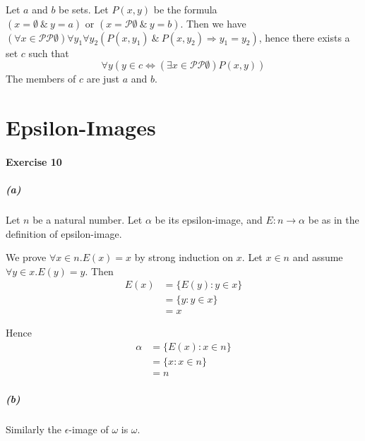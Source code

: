 \documentclass{report}
\begin{document}
     Let $a$ and $b$ be sets. Let $P(x,y)$ be the formula $(x = \emptyset \ \&\ y = a) \text{ or }
     (x = \mathcal{P} \emptyset \ \&\ y = b)$. Then we have $(\forall x \in \mathcal{P} \mathcal{P}
     \emptyset) \forall y_1 \forall y_2 (P(x,y_1) \ \&\ P(x,y_2) \Rightarrow y_1 = y_2)$,
     hence there exists a set $c$ such that
     \[ \forall y (y \in c \Leftrightarrow (\exists x \in \mathcal{P} \mathcal{P} \emptyset) P(x,y)) \]
     The members of $c$ are just $a$ and $b$.

     \section{Epsilon-Images}

     \paragraph{Exercise 10}
     \subparagraph{(a)}
     Let $n$ be a natural number. Let $\alpha$ be its epsilon-image, and $E : n \rightarrow \alpha$ be as in
     the definition of epsilon-image.

     We prove $\forall x \in n. E(x) = x$ by strong induction on $x$. Let $x \in n$ and assume
     $\forall y \in x. E(y) = y$. Then
     \begin{align*}
        E(x) & = \{ E(y) : y \in x \} \\
        & = \{ y : y \in x \} \\
        & = x
     \end{align*}

     Hence
     \begin{align*}
        \alpha & = \{ E(x) : x \in n \} \\
        & = \{ x : x \in n \} \\
        & = n
     \end{align*}

     \subparagraph{(b)}
     Similarly the $\epsilon$-image of $\omega$ is $\omega$.
\end{document}
